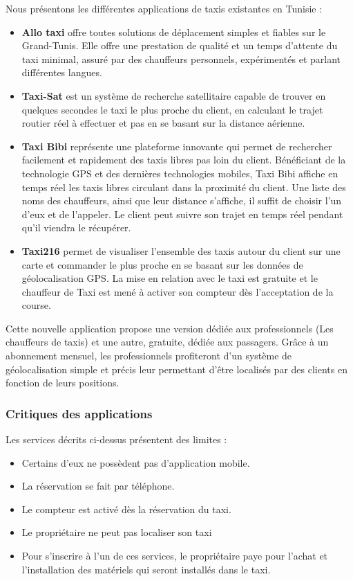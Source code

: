 {Nous présentons les différentes applications de taxis existantes en Tunisie :\\
\begin{itemize}
\item \textbf{Allo taxi} offre toutes solutions de déplacement simples et fiables sur le Grand-Tunis. Elle offre une prestation de qualité et un temps d'attente du taxi minimal, assuré par des chauffeurs personnels, expérimentés et parlant différentes langues.
\item \textbf{Taxi-Sat} est un système de recherche satellitaire capable de trouver en quelques secondes le taxi le plus proche du client, en calculant le trajet routier réel à effectuer et pas en se basant sur la distance aérienne.
\item \textbf{Taxi Bibi} représente une plateforme innovante qui  permet de rechercher facilement et rapidement des taxis libres pas loin du client. Bénéficiant de la technologie GPS et des dernières technologies mobiles, Taxi Bibi affiche en temps réel les taxis libres circulant dans la proximité du client. Une liste des noms des chauffeurs, ainsi que leur distance s'affiche, il suffit de choisir l'un d'eux et de l'appeler. Le client peut suivre son trajet en temps réel pendant qu'il viendra le récupérer.
\item \textbf{Taxi216} permet de visualiser l'ensemble des taxis autour du client sur une carte et commander le plus proche en se basant sur les données de géolocalisation GPS. La mise en relation avec le taxi est gratuite et le chauffeur de Taxi est mené à activer son compteur dès l'acceptation de la course.\\
\end{itemize}

Cette nouvelle application propose une version dédiée aux professionnels (Les chauffeurs de taxis) et une autre, gratuite, dédiée aux passagers. Grâce à un abonnement mensuel, les professionnels profiteront d'un système de géolocalisation simple et précis leur permettant d'être localisés par des clients en fonction de leurs positions.

\subsubsection{Critiques des applications}

Les services décrits ci-dessus présentent des limites :

\begin{itemize}
\item Certains d'eux ne possèdent pas d'application mobile.
\item La réservation se fait par téléphone.
\item Le compteur est activé dès la réservation du taxi.
\item Le propriétaire ne peut pas localiser son taxi  
\item Pour s'inscrire à l'un de ces services, le propriétaire paye pour l'achat et l'installation des matériels qui seront installés dans le taxi.
\end{itemize}

}
